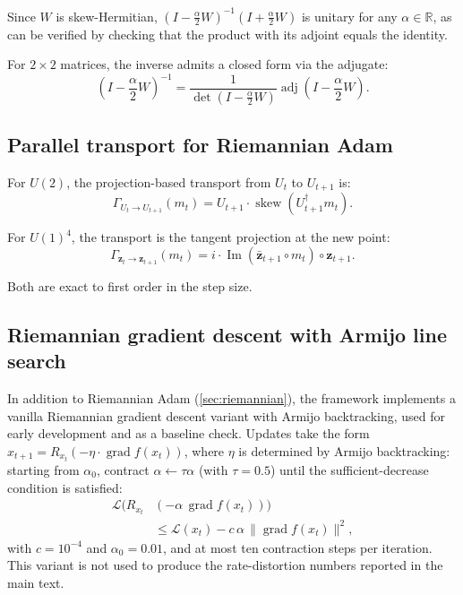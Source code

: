 \documentclass[a4paper, twocolumn]{quantumarticle}
\newcommand{\RR}{\mathbb{R}}
\newcommand{\LL}{\mathcal{L}}
\renewcommand{\skew}{\operatorname{skew}}
\newcommand{\grad}{\operatorname{grad}}
\begin{document}
Since $W$ is skew-Hermitian, $(I - \frac{\alpha}{2}W)^{-1}(I + \frac{\alpha}{2}W)$ is unitary for any $\alpha \in \RR$, as can be verified by checking that the product with its adjoint equals the identity.

For $2 \times 2$ matrices, the inverse admits a closed form via the adjugate:
\begin{equation}
  (I - \frac{\alpha}{2}W)^{-1} = \frac{1}{\det(I - \frac{\alpha}{2}W)} \operatorname{adj}(I - \frac{\alpha}{2}W).
\end{equation}

\subsection{Parallel transport for Riemannian Adam}
\label{app:parallel_transport}

For $U(2)$, the projection-based transport from $U_t$ to $U_{t+1}$ is:
\begin{equation}
  \Gamma_{U_t \to U_{t+1}}(m_t) = U_{t+1} \cdot \skew(U_{t+1}^\dagger m_t).
\end{equation}

For $U(1)^4$, the transport is the tangent projection at the new point:
\begin{equation}
  \Gamma_{\mathbf{z}_t \to \mathbf{z}_{t+1}}(m_t) = i \cdot \operatorname{Im}(\bar{\mathbf{z}}_{t+1} \circ m_t) \circ \mathbf{z}_{t+1}.
\end{equation}

Both are exact to first order in the step size.

\subsection{Riemannian gradient descent with Armijo line search}
\label{app:armijo_gd}

In addition to Riemannian Adam (\cref{sec:riemannian}), the framework implements a vanilla Riemannian gradient descent variant with Armijo backtracking, used for early development and as a baseline check.
Updates take the form $x_{t+1} = R_{x_t}(-\eta \cdot \grad f(x_t))$, where $\eta$ is determined by Armijo backtracking: starting from $\alpha_0$, contract $\alpha \leftarrow \tau \alpha$ (with $\tau = 0.5$) until the sufficient-decrease condition is satisfied:
\begin{equation}
\begin{aligned}
  \LL\big(R_{x_t}&(-\alpha\, \grad f(x_t))\big) \\
  &\leq \LL(x_t) - c\, \alpha\, \|\grad f(x_t)\|^2,
\end{aligned}
\end{equation}
with $c = 10^{-4}$ and $\alpha_0 = 0.01$, and at most ten contraction steps per iteration.
This variant is not used to produce the rate-distortion numbers reported in the main text.
\end{document}
